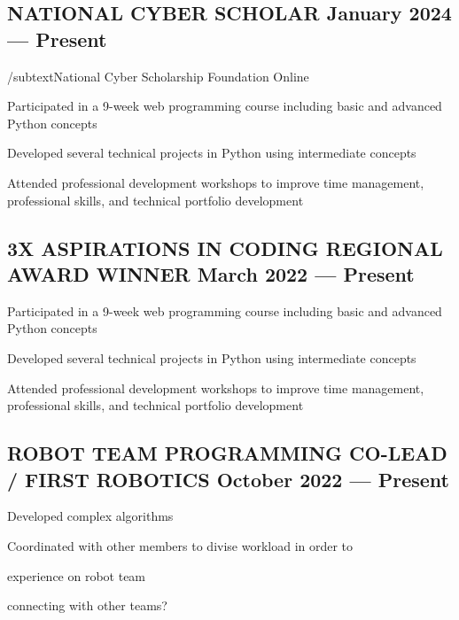 \subsection{{NATIONAL CYBER SCHOLAR \hfill January 2024 --- Present}}
/subtext{National Cyber Scholarship Foundation \hfill Online}
\begin{zitemize}
\item Participated in a 9-week web programming course including basic and advanced Python concepts
\item Developed several technical projects in Python using intermediate concepts
\item Attended professional development workshops to improve time management, professional skills, and technical portfolio development 
\end{zitemize}

\subsection{{3X ASPIRATIONS IN CODING REGIONAL AWARD WINNER \hfill March 2022 --- Present}}
\begin{zitemize}
\item Participated in a 9-week web programming course including basic and advanced Python concepts
\item Developed several technical projects in Python using intermediate concepts
\item Attended professional development workshops to improve time management, professional skills, and technical portfolio development 
\end{zitemize}

\subsection{{ROBOT TEAM PROGRAMMING CO-LEAD / FIRST ROBOTICS \hfill October 2022 --- Present}}
\begin{zitemize}
\item Developed complex algorithms %
\item Coordinated with other members to divise workload in order to 
\item experience on robot team
\item connecting with other teams?
\end{zitemize}

